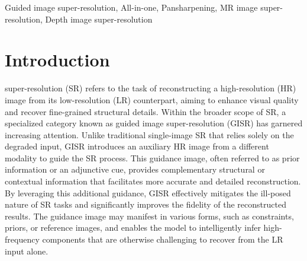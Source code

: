 \documentclass[lettersize,journal]{IEEEtran}
\begin{document}
\begin{abstract}
\end{abstract}

\begin{IEEEkeywords}
Guided image super-resolution, All-in-one, Pansharpening, MR image super-resolution, Depth image super-resolution
\end{IEEEkeywords}

\section{Introduction}

 super-resolution (SR) refers to the task of reconstructing a high-resolution (HR) image from its low-resolution (LR) counterpart, aiming to enhance visual quality and recover fine-grained structural details. Within the broader scope of SR, a specialized category known as guided image super-resolution (GISR) has garnered increasing attention. Unlike traditional single-image SR that relies solely on the degraded input, GISR introduces an auxiliary HR image from a different modality to guide the SR process. This guidance image, often referred to as prior information or an adjunctive cue, provides complementary structural or contextual information that facilitates more accurate and detailed reconstruction.
By leveraging this additional guidance, GISR effectively mitigates the ill-posed nature of SR tasks and significantly improves the fidelity of the reconstructed results. The guidance image may manifest in various forms, such as constraints, priors, or reference images, and enables the model to intelligently infer high-frequency components that are otherwise challenging to recover from the LR input alone.
\end{document}
